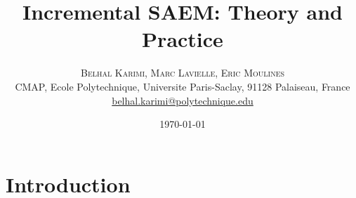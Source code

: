 \documentclass[a4paper]{article}
\theoremstyle{plain}
\theoremstyle{plain}
\theoremstyle{definition}
\begin{document}
\title{Incremental SAEM: Theory and Practice} 


\author{%
\textsc{Belhal Karimi, Marc Lavielle, Eric Moulines}\\
\normalsize  CMAP, Ecole Polytechnique, Universite Paris-Saclay, 91128 Palaiseau, France\\ %
\normalsize \href{}{belhal.karimi@polytechnique.edu} %
}
\date{\today} %
                                                                      


\maketitle



\section{Introduction}
\end{document}
